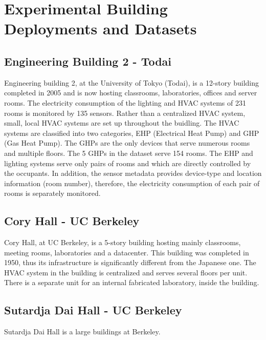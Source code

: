 \section{Experimental Building Deployments and Datasets}

\subsection{Engineering Building 2 - Todai}\label{data:engbldg2}
Engineering building 2, at the University of Tokyo (Todai), is a 12-story building completed in 2005 and is now 
hosting classrooms, laboratories, offices 
and server rooms.  
The electricity consumption of the lighting and HVAC systems of 231 rooms is monitored by 135 sensors.
Rather than a centralized HVAC system, small, local HVAC systems are set up throughout the buidling.  
The HVAC systems are classified into two categories, EHP (Electrical Heat Pump) and GHP (Gas Heat Pump).
The GHPs are the only devices that serve numerous rooms and multiple floors.  The 5 GHPs in the dataset serve 154 rooms.
The EHP and lighting systems serve only pairs of rooms and which are directly controlled by the occupants.
In addition, the sensor metadata provides device-type and location information (room number), 
therefore, the electricity consumption of each pair of rooms is separately monitored.




\subsection{Cory Hall - UC Berkeley}
Cory Hall, at UC Berkeley, is a 5-story building hosting mainly classrooms, meeting rooms, laboratories and a datacenter.
This building was completed in 1950, thus its infrastructure is significantly different from the Japanese one.
The HVAC system in the building is centralized and serves several floors per unit.
There is a separate unit for an internal fabricated laboratory, inside the building.

\subsection{Sutardja Dai Hall - UC Berkeley}
Sutardja Dai Hall is a large buildings at Berkeley.


